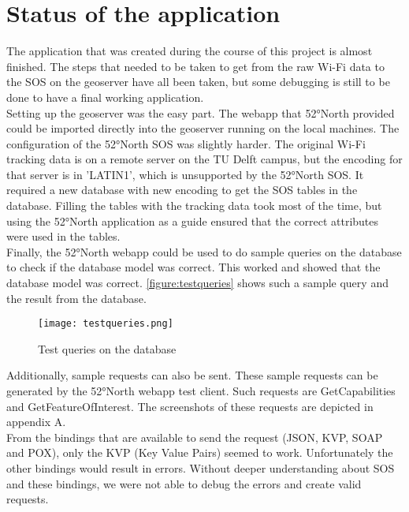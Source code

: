 \chapter{Status of the application}


The application that was created during the course of this project is almost finished. The steps that needed to be taken to get from the raw Wi-Fi data to the SOS on the geoserver have all been taken, but some debugging is still to be done to have a final working application. \\
Setting up the geoserver was the easy part. The webapp that 52°North provided could be imported directly into the geoserver running on the local machines. The configuration of the 52°North SOS was slightly harder. The original Wi-Fi tracking data is on a remote server on the TU Delft campus, but the encoding for that server is in 'LATIN1', which is unsupported by the 52°North SOS. It required a new database with new encoding to get the SOS tables in the database. Filling the tables with the tracking data took most of the time, but using the 52°North application as a guide ensured that the correct attributes were used in the tables. \\
Finally, the 52°North webapp could be used to do sample queries on the database to check if the database model was correct. This worked and showed that the database model was correct. \autoref{figure:testqueries} shows such a sample query and the result from the database. 
\begin{figure}[H]
\centering
\texttt{[image: testqueries.png]}
\captionsetup{justification=centering}
\caption{Test queries on the database}
\label{figure:testqueries}
\end{figure}

Additionally, sample requests can also be sent. These sample requests can be generated by the 52°North webapp test client. Such requests are GetCapabilities and GetFeatureOfInterest. The screenshots of these requests are depicted in appendix A. \\

From the bindings that are available to send the request (JSON, KVP, SOAP and POX), only the KVP (Key Value Pairs) seemed to work. Unfortunately the other bindings would result in errors. Without deeper understanding about SOS and these bindings, we were not able to debug the errors and create valid requests. 
